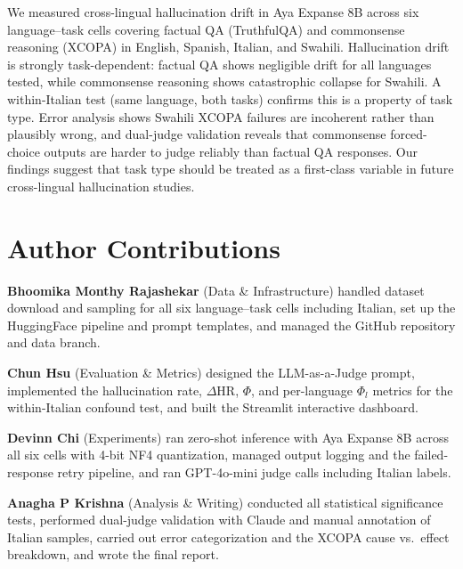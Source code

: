 \documentclass[11pt]{article}
\begin{document}
We measured cross-lingual hallucination drift in Aya Expanse 8B across six
language--task cells covering factual QA (TruthfulQA) and commonsense reasoning
(XCOPA) in English, Spanish, Italian, and Swahili. Hallucination drift is
strongly task-dependent: factual QA shows negligible drift for all languages
tested, while commonsense reasoning shows catastrophic collapse for Swahili.
A within-Italian test (same language, both tasks) confirms this is a
property of task type. Error analysis shows Swahili XCOPA failures are
incoherent rather than plausibly wrong, and dual-judge validation reveals that
commonsense forced-choice outputs are harder to judge reliably than factual QA
responses. Our findings suggest that task type should be treated as a
first-class variable in future cross-lingual hallucination studies.

\section*{Author Contributions}

\textbf{Bhoomika Monthy Rajashekar} (Data \& Infrastructure) handled dataset
download and sampling for all six language--task cells including Italian, set
up the HuggingFace pipeline and prompt templates, and managed the GitHub
repository and data branch.

\textbf{Chun Hsu} (Evaluation \& Metrics) designed the LLM-as-a-Judge prompt,
implemented the hallucination rate, $\Delta$HR, $\Phi$, and per-language
$\Phi_l$ metrics for the within-Italian confound test, and built the Streamlit
interactive dashboard.

\textbf{Devinn Chi} (Experiments) ran zero-shot inference with Aya Expanse 8B
across all six cells with 4-bit NF4 quantization, managed output logging and
the failed-response retry pipeline, and ran GPT-4o-mini judge calls including
Italian labels.

\textbf{Anagha P Krishna} (Analysis \& Writing) conducted all statistical
significance tests, performed dual-judge validation with Claude and manual
annotation of Italian samples, carried out error categorization and the XCOPA
cause vs.\ effect breakdown, and wrote the final report.



\end{document}
